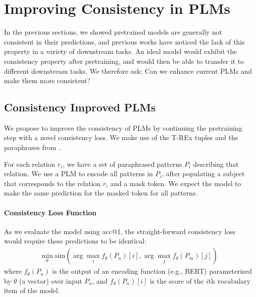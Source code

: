 \section{Improving Consistency in PLMs}
\label{sec:adding_consistency}

In the previous sections, we showed pretrained models are generally not consistent in their predictions, and previous works have noticed the lack of this property in a variety of downstream tasks.
An ideal model would exhibit the consistency property after pretraining, and would then be able to transfer it to different downstream tasks. We therefore ask:
Can we enhance current PLMs and make them more consistent?

\subsection{Consistency Improved PLMs}
We propose to improve the consistency of PLMs by continuing the pretraining step with a novel consistency loss. %
We make use of the T-REx tuples and the paraphrases from \resource{}.

For each relation $r_i$, we
have a set of paraphrased patterns $P_i$ describing that relation.
We use a PLM to encode all patterns in $P_i$, after populating a subject that corresponds to the relation $r_i$ and a mask token. We expect the model to make the same prediction for the masked token for all patterns.


\paragraph{Consistency Loss Function}
As we evaluate the model using acc@1, the straight-forward consistency loss would require these predictions to be identical:
\begin{gather*} 
\min_{\theta} \mbox{sim}(\arg\max_i f_\theta(P_n)[i], \arg\max_j f_\theta(P_m)[j])%
\end{gather*}
where $f_\theta(P_n)$ is the output of an encoding function (e.g., BERT) parameterized by $\theta$ (a vector) over input $P_n$, and $f_\theta(P_n)[i]$ is the score of the $i$th vocabulary item of the model.

